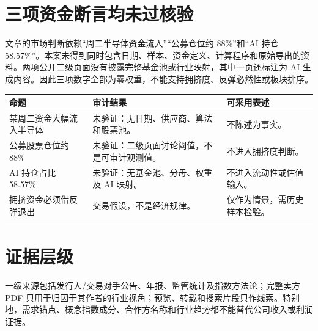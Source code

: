 \section{三项资金断言均未过核验}
文章的市场判断依赖“周二半导体资金流入”“公募仓位约 88\%”和“AI 持仓 58.57\%”。本案未得到同时包含日期、样本、资金定义、计算程序和原始导出的资料。两项公开二级页面没有披露完整基金池或行业映射，其中一页还标注为 AI 生成内容。因此三项数字全部为零权重，不能支持拥挤度、反弹必然性或板块排序。

\begin{exhibitbox}[文章命题的证据状态]
\small
\begin{tabularx}{\exhibitboxwidth}{L{2.4cm}X L{2.4cm}}
\toprule 命题 & 审计结果 & 可采用表述\\ \midrule
某周二资金大幅流入半导体 & 未验证：无日期、供应商、算法和股票池。 & 不陈述为事实。\\
公募股票仓位约 88\% & 未验证：二级页面讨论阈值，不是可审计观测值。 & 不进入拥挤度判断。\\
AI 持仓占比 58.57\% & 未验证：无基金池、分母、权重及 AI 映射。 & 不进入流动性或估值输入。\\
拥挤资金必须借反弹退出 & 交易假设，不是经济规律。 & 仅作为情景，需历史样本检验。\\
\bottomrule
\end{tabularx}
\end{exhibitbox}

\section{证据层级}
一级来源包括发行人/交易对手公告、年报、监管统计及指数方法论；完整卖方 PDF 只用于归因于其作者的行业视角；预览、转载和搜索片段只作线索。特别地，需求锚点、概念指数成分、合作方名称和行业趋势都不能替代公司收入或利润证据。
